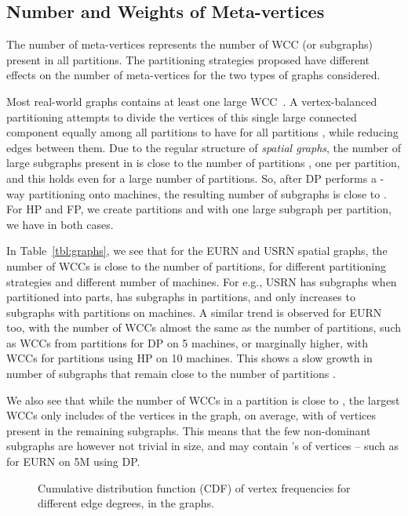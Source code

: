 \documentclass[10pt,conference, compsocconf]{IEEEtran}
\begin{document}
\subsection{Number and Weights of Meta-vertices} 
The number of meta-vertices represents the number of WCC (or subgraphs) present in all partitions. The partitioning strategies proposed have different effects on the number of meta-vertices for the two types of graphs considered.


Most real-world graphs contains at least one large WCC~\cite{faloutsos}. A vertex-balanced partitioning attempts to divide the vertices of this single large connected component equally among all partitions to have  for all partitions , while reducing edges between them. Due to the regular structure of \emph{spatial graphs}, the number of large subgraphs present in  is close to the number of partitions , one per partition, and this holds even for a large number of partitions. So, after DP performs a -way partitioning onto  machines, the resulting number of subgraphs is close to . For HP and FP, we create  partitions and with one large subgraph per partition, we have  in both cases.


In Table~\ref{tbl:graphs}, we see that for the EURN and USRN spatial graphs, the number of WCCs is close to the number of partitions, for different partitioning strategies and different number of machines. For e.g., USRN has  subgraphs when partitioned into  parts, has  subgraphs in  partitions, and only increases to  subgraphs with  partitions on  machines. A similar trend is observed for EURN too, with the number of WCCs almost the same as the number of partitions, such as  WCCs from  partitions for DP on 5 machines, or marginally higher, with  WCCs for  partitions using HP on 10 machines. This shows a slow growth in number of subgraphs  that remain close to the number of partitions . 

We also see that while the number of WCCs in a partition is close to , the largest  WCCs only includes  of the vertices in the graph, on average, with  of vertices present in the remaining  subgraphs. This means that the few non-dominant subgraphs are however not trivial in size, and may contain 's of vertices -- such as  for EURN on 5M using DP.

\begin{figure*}[t!]
\vspace{-0.1in}
\centering {}
\caption{Cumulative distribution function (CDF) of vertex frequencies for different edge degrees, in the  graphs.}
\label{fig:edgedeg}
\vspace{-0.1in}
\end{figure*}
\end{document}
